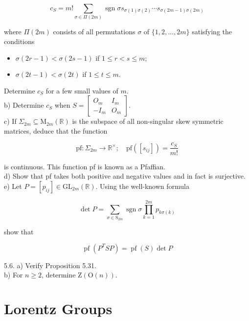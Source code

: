 \documentclass[10pt, letterpaper]{article}
\begin{document}
$$
c_{S}=m!\sum_{\sigma \in \Pi(2 m)} \operatorname{sgn} \sigma s_{\sigma(1) \sigma(2)} \cdots s_{\sigma(2 m-1) \sigma(2 m)}
$$

where $\Pi(2 m)$ consists of all permutations $\sigma$ of $\{1,2, \ldots, 2 m\}$ satisfying the conditions

\begin{itemize}
  \item $\sigma(2 r-1)<\sigma(2 s-1)$ if $1 \leqslant r<s \leqslant m$;
  \item $\sigma(2 t-1)<\sigma(2 t)$ if $1 \leqslant t \leqslant m$.
\end{itemize}

Determine $c_{S}$ for a few small values of $m$.\\
b) Determine $c_{S}$ when $S=\left[\begin{array}{cc}O_{m} & I_{m} \\ -I_{m} & O_{m}\end{array}\right]$.\\
c) If $\Sigma_{2 m} \subseteq \mathrm{M}_{2 m}(\mathbb{R})$ is the subspace of all non-singular skew symmetric matrices, deduce that the function

$$
\mathrm{pf}: \Sigma_{2 m} \longrightarrow \mathbb{R}^{\times} ; \quad \mathrm{pf}\left(\left[s_{i j}\right]\right)=\frac{c_{S}}{m!}
$$

is continuous. This function pf is known as a Pfaffian.\\
d) Show that pf takes both positive and negative values and in fact is surjective.\\
e) Let $P=\left[p_{i j}\right] \in \mathrm{GL}_{2 m}(\mathbb{R})$. Using the well-known formula

$$
\operatorname{det} P=\sum_{\sigma \in \mathrm{S}_{2 m}} \operatorname{sgn} \sigma \prod_{k=1}^{2 m} p_{k \sigma(k)}
$$

show that

$$
\operatorname{pf}\left(P^{T} S P\right)=\operatorname{pf}(S) \operatorname{det} P
$$

5.6. a) Verify Proposition 5.31.\\
b) For $n \geqslant 2$, determine $\mathrm{Z}(\mathrm{O}(n))$.



\pagebreak


\section{Lorentz Groups}
\end{document}
